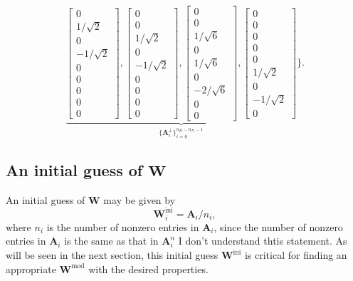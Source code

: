 \begin{equation}
	\underbrace{\begin{bmatrix} 0\\ 1/\sqrt{2}\\ 0\\ -1/\sqrt{2}\\ 0\\ 0\\ 0\\ 0\\ 0 \end{bmatrix},
		\begin{bmatrix} 0\\ 0\\ 1/\sqrt{2}\\ 0\\ -1/\sqrt{2}\\ 0\\ 0\\ 0\\ 0 \end{bmatrix},
		\begin{bmatrix} 0\\ 0\\ 1/\sqrt{6}\\ 0\\ 1/\sqrt{6}\\ 0\\ -2/\sqrt{6}\\ 0\\ 0 \end{bmatrix},
		\begin{bmatrix} 0\\ 0\\ 0\\ 0\\ 0\\ 1/\sqrt{2}\\ 0\\ -1/\sqrt{2}\\ 0 \end{bmatrix}}_{\{\mathbf{A}^\perp_i\}_{i=0}^{n_B-n_N-1}}
	\Biggr\}.
\end{equation}

\subsection{An initial guess of $\mathbf{W}$}
An initial guess of $\mathbf{W}$ may be given by
\begin{equation}
	\mathbf{W}^\text{ini}_i=\mathbf{A}_i/n_i,\label{eq:initial_guess}
\end{equation}
where $n_i$ is the number of nonzero entries in $\mathbf{A}_i$, since the number of nonzero entries in $\mathbf{A}_i$ is the same as that in $\mathbf{A}^n_i$ {\color{red} I don't understand thtis statement}. As will be seen in the next section, this initial guess $\mathbf{W}^\text{ini}$ is critical for finding an appropriate $\mathbf{W}^\text{mod}$ with the desired properties.

